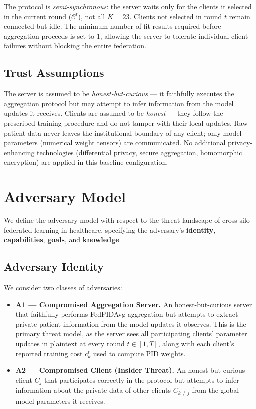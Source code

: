 \documentclass{article}
\begin{document}
The protocol is \textit{semi-synchronous}: the server waits only for the clients it selected in the current round ($\mathcal{C}^t$), not all $K = 23$. Clients not selected in round $t$ remain connected but idle. The minimum number of fit results required before aggregation proceeds is set to 1, allowing the server to tolerate individual client failures without blocking the entire federation.

\subsection{Trust Assumptions}

The server is assumed to be \textit{honest-but-curious} --- it faithfully executes the aggregation protocol but may attempt to infer information from the model updates it receives. Clients are assumed to be \textit{honest} --- they follow the prescribed training procedure and do not tamper with their local updates. Raw patient data never leaves the institutional boundary of any client; only model parameters (numerical weight tensors) are communicated. No additional privacy-enhancing technologies (differential privacy, secure aggregation, homomorphic encryption) are applied in this baseline configuration.

\section{Adversary Model}

We define the adversary model with respect to the threat landscape of cross-silo federated learning in healthcare, specifying the adversary's \textbf{identity}, \textbf{capabilities}, \textbf{goals}, and \textbf{knowledge}.

\subsection{Adversary Identity}

We consider two classes of adversaries:

\begin{itemize}
    \item \textbf{A1 --- Compromised Aggregation Server.} An honest-but-curious server that faithfully performs FedPIDAvg aggregation but attempts to extract private patient information from the model updates it observes. This is the primary threat model, as the server sees all participating clients' parameter updates in plaintext at every round $t \in [1, T]$, along with each client's reported training cost $c_k^t$ used to compute PID weights.

    \item \textbf{A2 --- Compromised Client (Insider Threat).} An honest-but-curious client $C_j$ that participates correctly in the protocol but attempts to infer information about the private data of other clients $C_{k \neq j}$ from the global model parameters it receives.
\end{itemize}
\end{document}
